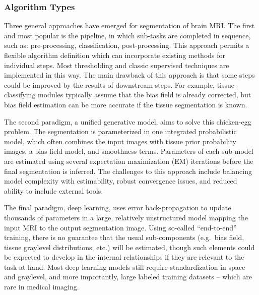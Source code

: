 \subsubsection{Algorithm Types}\label{sss:prior-models}
Three general approaches have emerged for segmentation of brain MRI.
The first and most popular is the pipeline,
in which sub-tasks are completed in sequence,
such as: pre-processing, classification, post-processing.
This approach permits a flexible algorithm definition
which can incorporate existing methods for individual steps.
Most thresholding and classic supervised techniques are implemented in this way.
The main drawback of this approach is that
some steps could be improved by the results of downstream steps.
For example, tissue classifying modules typically assume that the bias field is already corrected,
but bias field estimation can be more accurate if the tissue segmentation is known.
\par
The second paradigm, a unified generative model, aims to solve this chicken-egg problem.
The segmentation is parameterized in one integrated probabilistic model,
which often combines the input images with
tissue prior probability images, a bias field model, and smoothness terms.
Parameters of each sub-model are estimated using several expectation maximization (EM) iterations
before the final segmentation is inferred.
The challenges to this approach include
balancing model complexity with estimability,
robust convergence issues,
and reduced ability to include external tools.
\par
The final paradigm, deep learning,
uses error back-propagation to update thousands of parameters
in a large, relatively unstructured model mapping the input MRI to the output segmentation image.
Using so-called ``end-to-end'' training, there is no guarantee that the usual sub-components
(e.g.\ bias field, tissue graylevel distributions, etc.) will be estimated,
though such elements could be expected to develop in the internal relationships
if they are relevant to the task at hand.
Most deep learning models still require standardization in space and graylevel,
and more importantly, large labeled training datasets -- which are rare in medical imaging.
